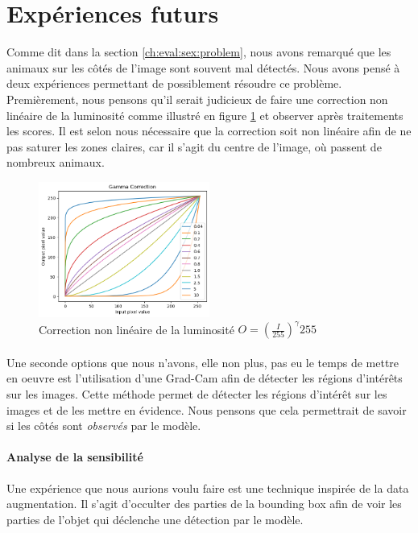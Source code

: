 \section{Expériences futurs}
Comme dit dans la section \ref{ch:eval:sex:problem}, nous avons remarqué que les animaux sur les côtés de l'image sont souvent mal détectés. Nous avons pensé à deux expériences permettant de possiblement résoudre ce problème. Premièrement, nous pensons qu'il serait judicieux de faire une correction non linéaire de la luminosité comme illustré en figure \ref{fig:gamma_correction} et observer après traitements les scores. Il est selon nous nécessaire que la correction soit non linéaire afin de ne pas saturer les zones claires, car il s'agit du centre de l'image, où passent de nombreux animaux.
\begin{figure}[H]
\centering
\includegraphics[width=0.5\textwidth]{images/gamma_correction.png}
\caption{Correction non linéaire de la luminosité $O = \displaystyle{\left( \frac{I}{255} \right)^\gamma255}$}
\label{fig:gamma_correction}
\end{figure}

\paragraph{}
Une seconde options que nous n'avons, elle non plus, pas eu le temps de mettre en oeuvre est l'utilisation d'une Grad-Cam afin de détecter les régions d'intérêts sur les images. Cette méthode permet de détecter les régions d'intérêt sur les images et de les mettre en évidence. Nous pensons que cela permettrait de savoir si les côtés sont \textit{observés} par le modèle.

\paragraph{Analyse de la sensibilité}
Une expérience que nous aurions voulu faire est une technique inspirée de la data augmentation. Il s'agit d'occulter des parties de la bounding box afin de voir les parties de l'objet qui déclenche une détection par le modèle.
